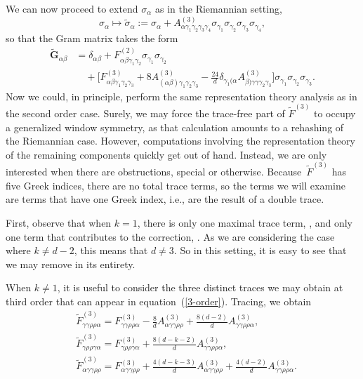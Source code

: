 \documentclass[pdftex]{sigma}
\numberwithin{equation}{section}
\newcommand{\bG}{\boldsymbol{G}}
\renewcommand{\=}{\stackrel \Lambda =}
\begin{document}
We can now proceed to extend $\sigma_{\alpha}$ as in the Riemannian setting,
\[\sigma_{\alpha} \mapsto \tilde{\sigma}_{\alpha} := \sigma_{\alpha} + A^{(3)}_{\alpha \gamma_1 \gamma_2 \gamma_3 \gamma_4} \sigma_{\gamma_1} \sigma_{\gamma_2} \sigma_{\gamma_3} \sigma_{\gamma_4} ,\]
so that the Gram matrix takes the form
\begin{align}
\tilde{\bG}_{\alpha \beta} &{}= \delta_{\alpha \beta}+ F^{(2)}_{\alpha \beta \gamma_1 \gamma_2} \sigma_{\gamma_1} \sigma_{\gamma_2}\nonumber \\
&\quad{}+ \biggl[F^{(3)}_{\alpha \beta \gamma_1 \gamma_2 \gamma_3} + 8 A^{(3)}_{(\alpha \beta) \gamma_1 \gamma_2 \gamma_3} - \frac{24}{d} \delta_{\gamma_1 (\alpha} A^{(3)}_{\beta) \gamma \gamma \gamma_2 \gamma_3} \biggr] \sigma_{\gamma_1} \sigma_{\gamma_2} \sigma_{\gamma_3} .\label{3-order}
\end{align}
Now we could, in principle, perform the same representation theory analysis as in the second order case. Surely, we may force the trace-free part of $\tilde{F}^{(3)}$ to occupy a generalized window symmetry, as that calculation amounts to a rehashing of the Riemannian case. However, computations involving the representation theory of the remaining components quickly get out of hand. Instead, we are only interested when there are obstructions, special or otherwise. Because~$\tilde{F}^{(3)}$ has five Greek indices, there are no total trace terms, so the terms we will examine are terms that have one Greek index, i.e., are the result of a double trace.

First, observe that when $k=1$, there is only one maximal trace term, , and only one term that contributes to the correction, . As we are considering the case where $k \neq d-2$, this means that $d \neq 3$. So in this setting, it is easy to see that we may remove  in its entirety.

When $k\neq 1$, it is useful to consider the three distinct traces we may obtain at third order that can appear in equation~(\ref{3-order}). Tracing, we obtain
\begin{align*}
&\tilde{F}^{(3)}_{\gamma \gamma \rho \rho \alpha} = F^{(3)}_{\gamma \gamma \rho \rho \alpha }- \frac{8}{d} A^{(3)}_{\alpha \gamma \gamma \rho \rho} + \frac{8(d-2)}{d} A^{(3)}_{\gamma \gamma \rho \rho \alpha} ,\\
&\tilde{F}^{(3)}_{\gamma \rho \rho \gamma \alpha} = F^{(3)}_{\gamma \rho \rho \gamma \alpha }+ \frac{8(d-k-2)}{d} A^{(3)}_{\gamma \gamma \rho \rho \alpha} ,\\
&\tilde{F}^{(3)}_{\alpha \gamma \gamma \rho \rho} = F^{(3)}_{\alpha \gamma \gamma \rho \rho}+ \frac{4(d-k-3)}{d} A^{(3)}_{\alpha \gamma \gamma \rho \rho} + \frac{4(d-2)}{d} A^{(3)}_{\gamma \gamma \rho \rho \alpha} .
\end{align*}
\end{document}
